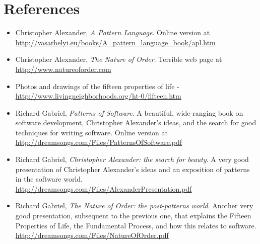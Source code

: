 \section*{References}
\begin{itemize}
 \item Christopher Alexander, \textit{A Pattern Language}. Online version at \url{http://vasarhelyi.eu/books/A\_pattern\_language\_book/apl.htm}
 \item Christopher Alexander, \textit{The Nature of Order}. Terrible web page at \url{http://www.natureoforder.com}
 \item Photos and drawings of the fifteen properties of life - \url{http://www.livingneighborhoods.org/ht-0/fifteen.htm}
 \item Richard Gabriel, \textit{Patterns of Software}. A beautiful, wide-ranging book on software development, Christopher Alexander's ideas, and the search for good techniques for writing software. Online version at \url{http://dreamsongs.com/Files/PatternsOfSoftware.pdf}
 \item Richard Gabriel, \textit{Christopher Alexander: the search for beauty}. A very good presentation of Christopher Alexander's ideas and an exposition of patterns in the software world. \url{http://dreamsongs.com/Files/AlexanderPresentation.pdf}
 \item Richard Gabriel, \textit{The Nature of Order: the post-patterns world}. Another very good presentation, subsequent to the previous one, that explains the Fifteen Properties of Life, the Fundamental Process, and how this relates to software. \url{http://dreamsongs.com/Files/NatureOfOrder.pdf}
\end{itemize}
